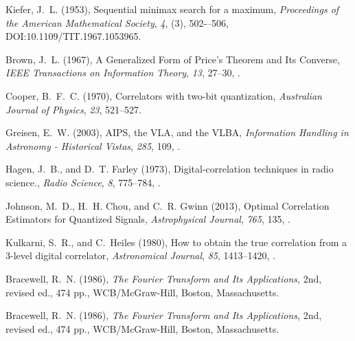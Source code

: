 \documentclass[letterpaper,twoside,12pt]{article}
\begin{document}
\begin{thebibliography}{99}

{Kiefer}, J.~L. (1953), {Sequential minimax search for a maximum}, \textit{Proceedings of the American Mathematical Society}, \textit{4}, (3), 502-–506, DOI:10.1109/TIT.1967.1053965.

{Brown}, J.~L. (1967), {A Generalized Form of Price's Theorem and Its Converse}, \textit{IEEE Transactions on Information Theory}, \textit{13}, 27--30, .

{Cooper}, B.~F.~C. (1970), {Correlators with two-bit quantization},
  \textit{Australian Journal of Physics}, \textit{23}, 521--527.

{Greisen}, E.~W. (2003), {AIPS, the VLA, and the VLBA}, \textit{Information
  Handling in Astronomy - Historical Vistas}, \textit{285}, 109,
  .

{Hagen}, J.~B., and D.~T. {Farley} (1973), {Digital-correlation techniques in
  radio science.}, \textit{Radio Science}, \textit{8}, 775--784,
  .

{Johnson}, M.~D., H.~H. {Chou}, and C.~R. {Gwinn} (2013), {Optimal Correlation
  Estimators for Quantized Signals}, \textit{Astrophysical Journal},
  \textit{765}, 135, .

{Kulkarni}, S.~R., and C.~{Heiles} (1980), {How to obtain the true correlation
  from a 3-level digital correlator}, \textit{Astronomical Journal},
  \textit{85}, 1413--1420, .



Bracewell, R.~N. (1986), \textit{{The Fourier Transform and Its Applications}},
  2nd, revised ed., 474 pp., WCB/McGraw-Hill, Boston, Massachusetts.

Bracewell, R.~N. (1986), \textit{{The Fourier Transform and Its Applications}},
  2nd, revised ed., 474 pp., WCB/McGraw-Hill, Boston, Massachusetts.



\end{thebibliography}
\end{document}
